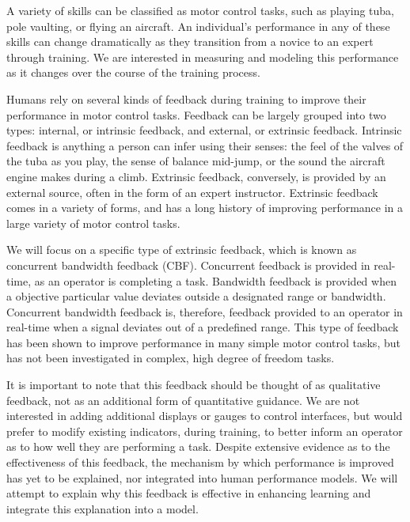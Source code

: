 A variety of skills can be classified as motor control tasks, such as playing tuba, pole vaulting, or flying an aircraft.
An individual's performance in any of these skills can change dramatically as they transition from a novice to an expert through training.
We are interested in measuring and modeling this performance as it changes over the course of the training process.

Humans rely on several kinds of feedback during training to improve their performance in motor control tasks.
Feedback can be largely grouped into two types: internal, or intrinsic feedback, and external, or extrinsic feedback.
Intrinsic feedback is anything a person can infer using their senses: the feel of the valves of the tuba as you play, the sense of balance mid-jump, or the sound the aircraft engine makes during a climb.
Extrinsic feedback, conversely, is provided by an external source, often in the form of an expert instructor.
Extrinsic feedback comes in a variety of forms, and has a long history of improving performance in a large variety of motor control tasks.

We will focus on a specific type of extrinsic feedback, which is known as concurrent bandwidth feedback (CBF).
Concurrent feedback is provided in real-time, as an operator is completing a task.
Bandwidth feedback is provided when a objective particular value deviates outside a designated range or bandwidth.
Concurrent bandwidth feedback is, therefore, feedback provided to an operator in real-time when a signal deviates out of a predefined range.
This type of feedback has been shown to improve performance in many simple motor control tasks, but has not been investigated in complex, high degree of freedom tasks.

It is important to note that this feedback should be thought of as qualitative feedback, not as an additional form of quantitative guidance.
We are not interested in adding additional displays or gauges to control interfaces, but would prefer to modify existing indicators, during training, to better inform an operator as to how well they are performing a task.
Despite extensive evidence as to the effectiveness of this feedback, the mechanism by which performance is improved has yet to be explained, nor integrated into human performance models.
We will attempt to explain why this feedback is effective in enhancing learning and integrate this explanation into a model.

